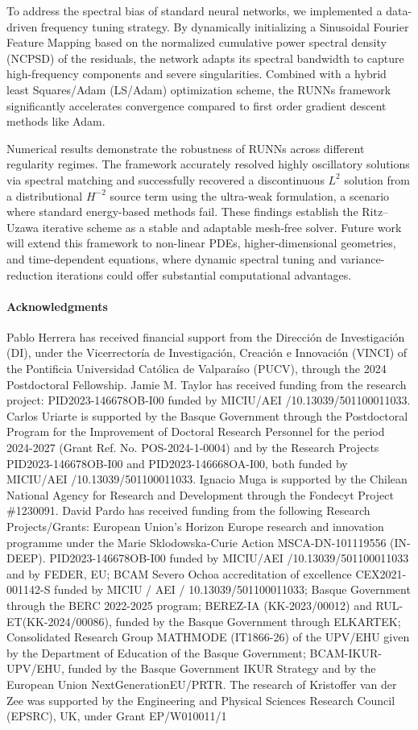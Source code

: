 \documentclass{article}
\theoremstyle{definition}
\begin{document}
To address the spectral bias of standard neural networks, we implemented a data-driven frequency tuning strategy. By dynamically initializing a Sinusoidal Fourier Feature Mapping based on the normalized cumulative power spectral density (NCPSD) of the residuals, the network adapts its spectral bandwidth to capture high-frequency components and severe singularities. Combined with a hybrid least Squares/Adam (LS/Adam) optimization scheme, the RUNNs framework significantly accelerates convergence compared to first order gradient descent methods like Adam.

Numerical results demonstrate the robustness of RUNNs across different regularity regimes. The framework accurately resolved highly oscillatory solutions via spectral matching and successfully recovered a discontinuous $L^2$ solution from a distributional $H^{-2}$ source term using the ultra-weak formulation, a scenario where standard energy-based methods fail. These findings establish the Ritz--Uzawa iterative scheme as a stable and adaptable mesh-free solver. Future work will extend this framework to non-linear PDEs, higher-dimensional geometries, and time-dependent equations, where dynamic spectral tuning and variance-reduction iterations could offer substantial computational advantages.

\paragraph{Acknowledgments}
Pablo Herrera has received financial support from the Dirección de Investigación (DI), under the Vicerrectoría de Investigación, Creación e Innovación (VINCI) of the Pontificia Universidad Católica de Valparaíso (PUCV), through the 2024 Postdoctoral Fellowship. Jamie M. Taylor has received funding from the research project: PID2023-146678OB-I00 funded by MICIU/AEI /10.13039/501100011033. Carlos Uriarte is supported by the Basque Government through the Postdoctoral Program for the Improvement of Doctoral Research Personnel for the period 2024-2027 (Grant Ref. No. POS-2024-1-0004) and by the Research Projects PID2023-146678OB-I00 and PID2023-146668OA-I00, both funded by MICIU/AEI /10.13039/501100011033. Ignacio Muga is supported by the Chilean National Agency for Research and Development through the Fondecyt Project \#1230091. David Pardo has received funding from the following Research Projects/Grants: 
European Union's Horizon Europe research and innovation programme under the Marie Sklodowska-Curie Action MSCA-DN-101119556 (IN-DEEP). 
PID2023-146678OB-I00 funded by MICIU/AEI /10.13039/501100011033 and by FEDER, EU;
BCAM Severo Ochoa accreditation of excellence CEX2021-001142-S funded by MICIU / AEI / 10.13039/501100011033; 
Basque Government through the BERC 2022-2025 program;
BEREZ-IA (KK-2023/00012) and RUL-ET(KK-2024/00086), funded by the Basque Government through ELKARTEK;
Consolidated Research Group MATHMODE (IT1866-26) of the UPV/EHU given by the Department of Education of the Basque Government; 
BCAM-IKUR-UPV/EHU, funded by the Basque Government IKUR Strategy and by the European Union NextGenerationEU/PRTR. 
The research of Kristoffer van der Zee was supported by the Engineering and Physical Sciences Research Council (EPSRC), UK, under Grant EP/W010011/1
\end{document}
